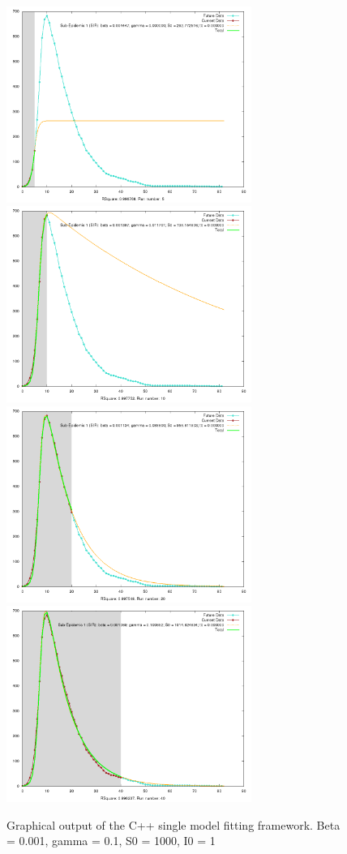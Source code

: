\begin{figure}
  \centering
  \includegraphics[width=8cm]{images/output5}
  \includegraphics[width=8cm]{images/output10}
  \includegraphics[width=8cm]{images/output20}
  \includegraphics[width=8cm]{images/output40}
\caption{Graphical output of the C++ single model fitting
  framework. Beta = 0.001, gamma = 0.1, S0 = 1000, I0 = 1}
\label{fig:sirc}
\end{figure}


